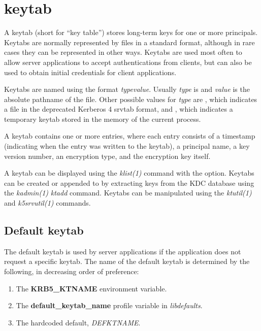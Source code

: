 \documentclass[letterpaper,10pt,english]{sphinxmanual}
\begin{document}
\chapter{keytab}
\label{basic/keytab_def:keytab}\label{basic/keytab_def::doc}\label{basic/keytab_def:keytab-definition}
A keytab (short for ``key table'') stores long-term keys for one or more
principals.  Keytabs are normally represented by files in a standard
format, although in rare cases they can be represented in other ways.
Keytabs are used most often to allow server applications to accept
authentications from clients, but can also be used to obtain initial
credentials for client applications.

Keytabs are named using the format \emph{type}\code{:}\emph{value}.  Usually
\emph{type} is  and \emph{value} is the absolute pathname of the file.
Other possible values for \emph{type} are , which indicates a
file in the deprecated Kerberos 4 srvtab format, and , which
indicates a temporary keytab stored in the memory of the current
process.

A keytab contains one or more entries, where each entry consists of a
timestamp (indicating when the entry was written to the keytab), a
principal name, a key version number, an encryption type, and the
encryption key itself.

A keytab can be displayed using the \emph{klist(1)} command with the
 option.  Keytabs can be created or appended to by extracting
keys from the KDC database using the \emph{kadmin(1)} \emph{ktadd}
command.  Keytabs can be manipulated using the \emph{ktutil(1)} and
\emph{k5srvutil(1)} commands.


\section{Default keytab}
\label{basic/keytab_def:default-keytab}
The default keytab is used by server applications if the application
does not request a specific keytab.  The name of the default keytab is
determined by the following, in decreasing order of preference:
\begin{enumerate}
\item {} 
The \textbf{KRB5\_KTNAME} environment variable.

\item {} 
The \textbf{default\_keytab\_name} profile variable in \emph{libdefaults}.

\item {} 
The hardcoded default, \emph{DEFKTNAME}.

\end{enumerate}
\end{document}
